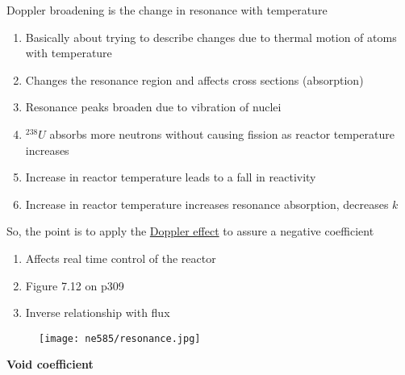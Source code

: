 \documentclass[aspectratio=1610,pdftex,dvipsnames,compress,xcolor={dvipsnames}]{beamer}
\begin{document}
\addtocounter{framenumber}{-1} 
\begin{frame}{Doppler broadening is the change in resonance with temperature}
    \begin{enumerate}[series=outerlist,topsep=0pt,itemsep=21pt,leftmargin=*,label=(\arabic*)]
        \item[]Basically about trying to describe changes due to thermal motion of atoms with temperature
        \item[]Changes the resonance region and affects cross sections (absorption)
        \item[]Resonance peaks broaden due to vibration of nuclei
        \item[]$^{238}U$ absorbs more neutrons without causing fission as reactor temperature increases
        \item[]Increase in reactor temperature leads to a fall in reactivity
        \item[]Increase in reactor temperature increases resonance absorption, decreases $k$
    \end{enumerate}
\end{frame}


\begin{frame}{So, the point is to apply the \href{https://uidaho.pressbooks.pub/nuclearengineering/chapter/nuclear-reactor-kinetics-2/}{Doppler effect} to assure a negative coefficient}
    \begin{enumerate}[series=outerlist,topsep=0pt,itemsep=21pt,leftmargin=*,label=(\arabic*)]
        \item[]Affects real time control of the reactor
        \item[]Figure 7.12 on p309
        \item[]Inverse relationship with flux
    \end{enumerate}
\end{frame}


\begin{frame}{}
    \begin{figure}
        \centering
        \texttt{[image: ne585/resonance.jpg]}
    \end{figure}
\end{frame}


\begin{frame}[plain]{}
    \centering\LARGE\textbf{Void coefficient}
\end{frame}
\end{document}
